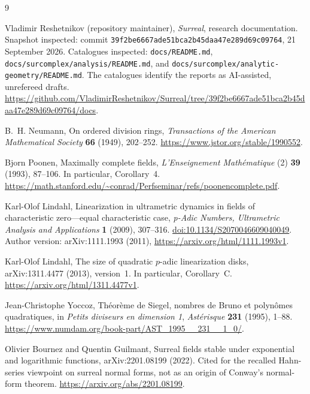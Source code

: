 \documentclass[11pt,letterpaper]{article}
\numberwithin{equation}{section}
\theoremstyle{plain}
\theoremstyle{definition}
\theoremstyle{remark}
\begin{document}
\clearpage
{}
{}
\begin{thebibliography}{9}

Vladimir Reshetnikov (repository maintainer),
\emph{Surreal}, research documentation.
Snapshot inspected: commit
\texttt{39f2be6667ade51bca2b45daa47e289d69c09764},
21 September 2026.
Catalogues inspected: \texttt{docs/README.md},
\texttt{docs/surcomplex/analysis/README.md}, and
\texttt{docs/surcomplex/analytic-geometry/README.md}.
The catalogues identify the reports as AI-assisted, unrefereed drafts.
\url{https://github.com/VladimirReshetnikov/Surreal/tree/39f2be6667ade51bca2b45daa47e289d69c09764/docs}.

B.~H. Neumann,
On ordered division rings,
\emph{Transactions of the American Mathematical Society}
\textbf{66} (1949), 202--252.
\url{https://www.jstor.org/stable/1990552}.

Bjorn Poonen,
Maximally complete fields,
\emph{L'Enseignement Math\'ematique} (2)
\textbf{39} (1993), 87--106.
In particular, Corollary~4.
\url{https://math.stanford.edu/~conrad/Perfseminar/refs/poonencomplete.pdf}.

Karl-Olof Lindahl,
Linearization in ultrametric dynamics in fields of characteristic zero---equal
characteristic case,
\emph{p-Adic Numbers, Ultrametric Analysis and Applications}
\textbf{1} (2009), 307--316.
\href{https://doi.org/10.1134/S2070046609040049}{doi:10.1134/S2070046609040049}.
Author version: arXiv:1111.1993 (2011),
\url{https://arxiv.org/html/1111.1993v1}.

Karl-Olof Lindahl,
The size of quadratic $p$-adic linearization disks,
arXiv:1311.4477 (2013), version~1.
In particular, Corollary~C.
\url{https://arxiv.org/html/1311.4477v1}.

Jean-Christophe Yoccoz,
Th\'eor\`eme de Siegel, nombres de Bruno et polyn\^omes quadratiques,
in \emph{Petits diviseurs en dimension 1},
\emph{Ast\'erisque} \textbf{231} (1995), 1--88.
\url{https://www.numdam.org/book-part/AST_1995__231__1_0/}.

Olivier Bournez and Quentin Guilmant,
Surreal fields stable under exponential and logarithmic functions,
arXiv:2201.08199 (2022).
Cited for the recalled Hahn-series viewpoint on surreal normal forms, not as
an origin of Conway's normal-form theorem.
\url{https://arxiv.org/abs/2201.08199}.

\end{thebibliography}
\end{document}

